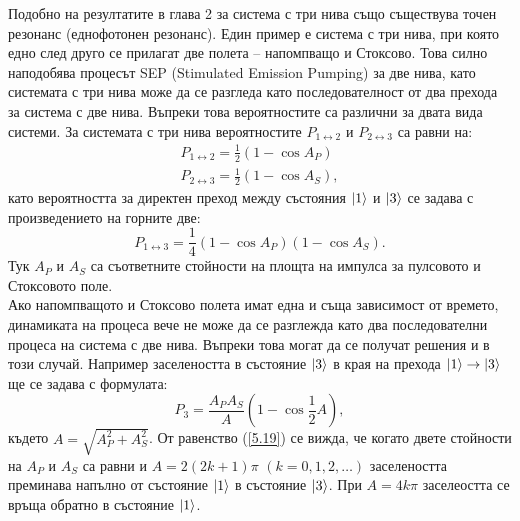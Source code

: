     \vspace{5mm}

    Подобно на резултатите в глава 2 за система с три нива също съществува точен резонанс (еднофотонен резонанс). Един пример е система с три нива, при която едно след
    друго се прилагат две полета -- напомпващо и Стоксово. Това силно наподобява процесът SEP (Stimulated Emission Pumping) за две нива, като системата с три нива може
    да се разгледа като последователност от два прехода за система с две нива. Въпреки това вероятностите са различни за двата вида системи. За системата с три нива
    вероятностите $P_{1\leftrightarrow 2}$ и $P_{2\leftrightarrow 3}$ са равни на:
    \begin{subequations}
        \begin{align}
            P_{1\leftrightarrow 2} = \frac{1}{2}\left(1-\cos A_P\right)\\
            P_{2\leftrightarrow 3} = \frac{1}{2}\left(1-\cos A_S\right),
        \end{align}
    \end{subequations}
    като вероятността за директен преход между състояния $\ket{1}$ и $\ket{3}$ се задава с произведението на горните две:
    \begin{equation}
        P_{1\leftrightarrow 3} = \frac{1}{4}\left(1-\cos A_P\right)\left(1 - \cos A_S\right).
    \end{equation}
    Тук $A_P$ и $A_S$ са съответните стойности на площта на импулса за пулсовото и Стоксовото поле.\\
    Ако напомпващото и Стоксово полета имат една и съща зависимост от времето, динамиката на процеса вече не може да се разглежда като два последователни процеса на
    система с две нива. Въпреки това могат да се получат решения и в този случай. Например заселеността в състояние $\ket{3}$ в края на прехода $\ket{1}\rightarrow\ket{3}$
    ще се задава с формулата:
    \begin{equation} \label{5.19}
        P_3 = \frac{A_PA_S}{A}\left(1-\cos\frac{1}{2}A\right),
    \end{equation}
    където $A = \sqrt{A_P^2+A_S^2}$. От равенство (\ref{5.19}) се вижда, че когато двете стойности на $A_P$ и $A_S$ са равни и $A = 2(2k+1)\pi$ $(k=0,1,2,\dots)$
    заселеността преминава напълно от състояние $\ket{1}$ в състояние $\ket{3}$. При $A=4k\pi$ заселеостта се връща обратно в състояние $\ket{1}$.